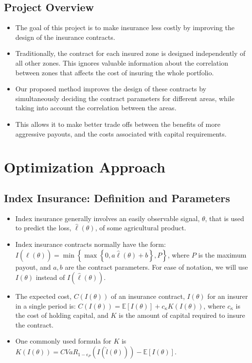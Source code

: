 \documentclass[11pt]{article}
\begin{document}
  \subsection{Project Overview}
    \begin{itemize}
        \item The goal of this project is to make insurance less costly by improving the design of the insurance contracts. 
        \item Traditionally, the contract for each insured zone is designed independently of all other zones. This ignores valuable information about the correlation between zones that affects the cost of insuring the whole portfolio. 
        \item Our proposed method improves the design of these contracts by simultaneously deciding the contract parameters for different areas, while taking into account the correlation between the areas. 
        \item This allows it to make better trade offs between the benefits of more aggressive payouts, and the costs associated with capital requirements. 
    \end{itemize}
    
\section{Optimization Approach}
  \subsection{Index Insurance: Definition and Parameters}
    \begin{itemize}
        \item Index insurance generally involves an easily observable signal, $\theta$, that is used to predict the loss, $\hat{\ell}(\theta)$, of some agricultural product.
        \item Index insurance contracts normally have the form: $I(\hat{\ell}(\theta)) = \min \left \{\max \left \{0,a\hat{\ell}(\theta) + b \right \}, P \right \}$, where $P$ is the maximum payout, and $a,b$ are the contract parameters. For ease of notation, we will use $I(\theta)$ instead of $I(\hat{\ell}(\theta))$.
        \item The expected cost, $C(I(\theta))$ of an insurance contract, $I(\theta)$ for an insurer in a single period is: $C(I(\theta)) = \mathbb{E}[I(\theta)] + c_{\kappa} K(I(\theta))$, where $c_{\kappa}$ is the cost of holding capital, and $K$ is the amount of capital required to insure the contract.
        \item One commonly used formula for $K$ is $K(I(\theta)) = CVaR_{1-\epsilon_P}\left ( I(\hat{l}(\theta)) \right ) - \mathbb{E}[I(\theta)]$.
    \end{itemize}
\end{document}
